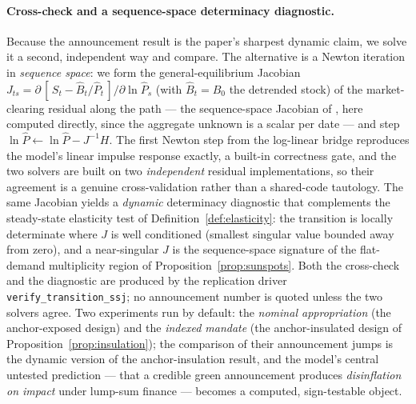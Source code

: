 \documentclass[12pt]{article}
\newcommand{\Sfun}{S}
\begin{document}
\paragraph{Cross-check and a sequence-space determinacy diagnostic.} Because
the announcement result is the paper's sharpest dynamic claim, we solve it a
second, independent way and compare. The alternative is a Newton iteration in
\emph{sequence space}: we form the general-equilibrium Jacobian
$J_{ts}=\partial\,[\,\Sfun_t-\hat B_t/\hat P_t\,]/\partial\ln\hat P_s$ (with
$\hat B_t=B_0$ the detrended stock) of the
market-clearing residual along the path --- the sequence-space Jacobian of
\citet{auclertetal2021}, here computed directly, since the aggregate unknown is
a scalar per date --- and step $\ln\hat P \leftarrow \ln\hat P - J^{-1}H$. The
first Newton step from the log-linear bridge reproduces the model's linear
impulse response exactly, a built-in correctness gate, and the two solvers are
built on two \emph{independent} residual implementations, so their agreement is
a genuine cross-validation rather than a shared-code tautology. The same
Jacobian yields a \emph{dynamic} determinacy diagnostic that complements the
steady-state elasticity test of Definition~\ref{def:elasticity}: the transition
is locally determinate where $J$ is well conditioned (smallest singular value
bounded away from zero), and a near-singular $J$ is the sequence-space
signature of the flat-demand multiplicity region of
Proposition~\ref{prop:sunspots}. Both the cross-check and the diagnostic are
produced by the replication driver \texttt{verify\_transition\_ssj}; no
announcement number is quoted unless the two solvers agree. Two experiments run by
default: the \emph{nominal appropriation} (the anchor-exposed design) and
the \emph{indexed mandate} (the anchor-insulated design of
Proposition~\ref{prop:insulation}); the comparison of their announcement
jumps is the dynamic version of the anchor-insulation result, and the
model's central untested prediction --- that a credible green
announcement produces \emph{disinflation on impact} under lump-sum
finance --- becomes a computed, sign-testable object.
\end{document}
